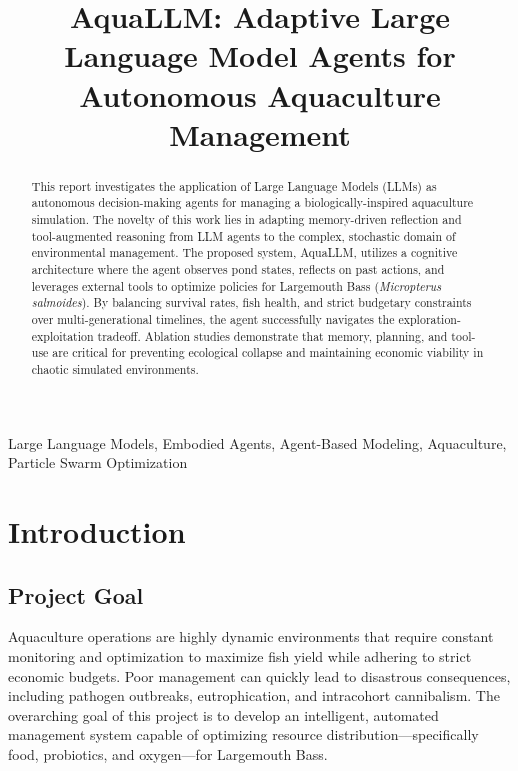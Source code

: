\documentclass[conference]{IEEEtran}
\begin{document}
\sloppy

\title{AquaLLM: Adaptive Large Language Model Agents for Autonomous Aquaculture Management\\}

\author{
}

\maketitle

\begin{abstract}
\normalfont
This report investigates the application of Large Language Models (LLMs) as autonomous decision-making agents for managing a biologically-inspired aquaculture simulation. The novelty of this work lies in adapting memory-driven reflection and tool-augmented reasoning from LLM agents to the complex, stochastic domain of environmental management. The proposed system, AquaLLM, utilizes a cognitive architecture where the agent observes pond states, reflects on past actions, and leverages external tools to optimize policies for Largemouth Bass (\textit{Micropterus salmoides}). By balancing survival rates, fish health, and strict budgetary constraints over multi-generational timelines, the agent successfully navigates the exploration-exploitation tradeoff. Ablation studies demonstrate that memory, planning, and tool-use are critical for preventing ecological collapse and maintaining economic viability in chaotic simulated environments.
\end{abstract}

\begin{IEEEkeywords}
Large Language Models, Embodied Agents, Agent-Based Modeling, Aquaculture, Particle Swarm Optimization
\end{IEEEkeywords}

\section{Introduction}

\subsection{Project Goal}
Aquaculture operations are highly dynamic environments that require constant monitoring and optimization to maximize fish yield while adhering to strict economic budgets. Poor management can quickly lead to disastrous consequences, including pathogen outbreaks, eutrophication, and intracohort cannibalism. The overarching goal of this project is to develop an intelligent, automated management system capable of optimizing resource distribution---specifically food, probiotics, and oxygen---for Largemouth Bass.
\end{document}
